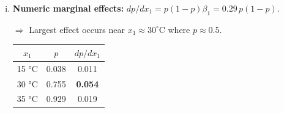 {\begin{enumerate}[a)]
\begin{enumerate}[(i)]
        The scaling term \(p(1-p)\le 0.25\) peaks at \(p=0.5\), explaining
        why the same coefficient \(\beta_{1}=0.29\) produces the largest
        probability change near the mid-range and almost none in the tails.
        
        
        
        
        \item\textbf{Numeric marginal effects:}
        $
        dp/dx_1 = p(1-p)\beta_1 = 0.29\,p(1-p).
        $
        
        $\Rightarrow$ Largest effect occurs near \(x_1\approx30^\circ\text{C}\) where \(p\approx0.5\).
        
        \begin{center}
        \begin{tabular}{ccc}
        \toprule
        \(x_1\) & \(p\) & \(dp/dx_1\) \\
        \midrule
        15 °C & 0.038 & 0.011 \\
        30 °C & 0.755 & \textbf{0.054} \\
        35 °C & 0.929 & 0.019 \\
        \bottomrule
        \end{tabular}
        \end{center}
        
        


\end{enumerate}
\end{enumerate}}
